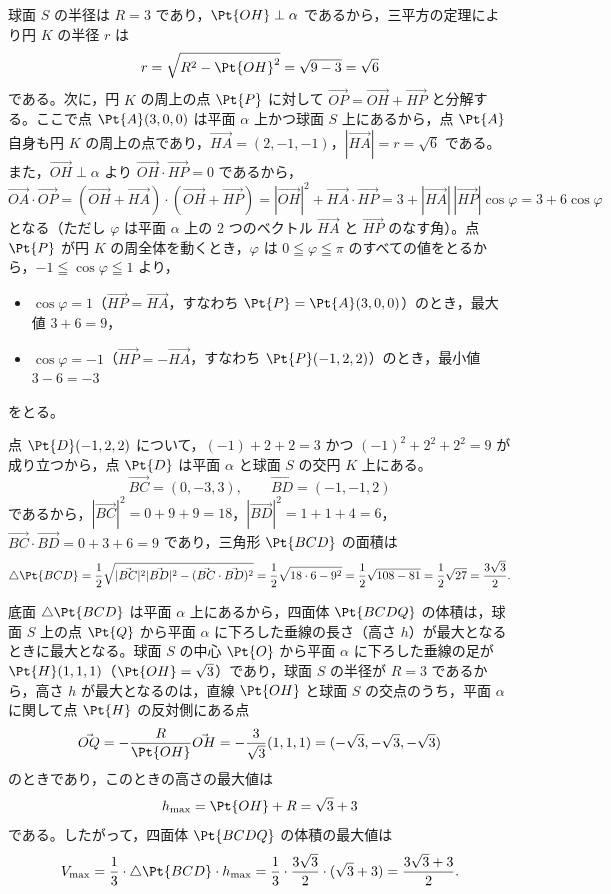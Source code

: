 
球面 $S$ の半径は $R=3$ であり，$\Pt{OH}\perp\alpha$ であるから，三平方の定理により円 $K$ の半径 $r$ は
\[
  r = \sqrt{R^{2}-\Pt{OH}^{2}} = \sqrt{9-3} = \sqrt{6}
\]
である。次に，円 $K$ の周上の点 $\Pt{P}$ に対して $\Vec{OP}=\Vec{OH}+\Vec{HP}$ と分解する。ここで点 $\Pt{A}(3, 0, 0)$ は平面 $\alpha$ 上かつ球面 $S$ 上にあるから，点 $\Pt{A}$ 自身も円 $K$ の周上の点であり，$\Vec{HA}=(2, -1, -1)$，$|\Vec{HA}|=r=\sqrt{6}$ である。また，$\Vec{OH}\perp\alpha$ より $\Vec{OH}\cdot\Vec{HP}=0$ であるから，
\[
  \Vec{OA}\cdot\Vec{OP}
  = (\Vec{OH}+\Vec{HA})\cdot(\Vec{OH}+\Vec{HP})
  = |\Vec{OH}|^{2} + \Vec{HA}\cdot\Vec{HP}
  = 3 + |\Vec{HA}|\,|\Vec{HP}|\cos\varphi
  = 3 + 6\cos\varphi
\]
となる（ただし $\varphi$ は平面 $\alpha$ 上の $2$ つのベクトル $\Vec{HA}$ と $\Vec{HP}$ のなす角）。点 $\Pt{P}$ が円 $K$ の周全体を動くとき，$\varphi$ は $0\leqq\varphi\leqq\pi$ のすべての値をとるから，$-1\leqq\cos\varphi\leqq 1$ より，
\begin{itemize}[leftmargin=1.6em,itemsep=2pt]
  \item $\cos\varphi=1$（$\Vec{HP}=\Vec{HA}$，すなわち $\Pt{P}=\Pt{A}(3,0,0)$）のとき，最大値 $3+6=9$，
  \item $\cos\varphi=-1$（$\Vec{HP}=-\Vec{HA}$，すなわち $\Pt{P}(-1,2,2)$）のとき，最小値 $3-6=-3$
\end{itemize}
をとる。


点 $\Pt{D}(-1, 2, 2)$ について，$(-1)+2+2=3$ かつ $(-1)^{2}+2^{2}+2^{2}=9$ が成り立つから，点 $\Pt{D}$ は平面 $\alpha$ と球面 $S$ の交円 $K$ 上にある。
\[
  \Vec{BC} = (0, -3, 3),\qquad \Vec{BD} = (-1, -1, 2)
\]
であるから，$|\Vec{BC}|^{2}=0+9+9=18$，$|\Vec{BD}|^{2}=1+1+4=6$，$\Vec{BC}\cdot\Vec{BD}=0+3+6=9$ であり，三角形 $\Pt{BCD}$ の面積は
\[
  \triangle\Pt{BCD}
  = \frac{1}{2}\sqrt{|\Vec{BC}|^{2}|\Vec{BD}|^{2}-(\Vec{BC}\cdot\Vec{BD})^{2}}
  = \frac{1}{2}\sqrt{18\cdot 6 - 9^{2}}
  = \frac{1}{2}\sqrt{108-81}
  = \frac{1}{2}\sqrt{27} = \frac{3\sqrt{3}}{2}.
\]


底面 $\triangle\Pt{BCD}$ は平面 $\alpha$ 上にあるから，四面体 $\Pt{BCDQ}$ の体積は，球面 $S$ 上の点 $\Pt{Q}$ から平面 $\alpha$ に下ろした垂線の長さ（高さ $h$）が最大となるときに最大となる。球面 $S$ の中心 $\Pt{O}$ から平面 $\alpha$ に下ろした垂線の足が $\Pt{H}(1, 1, 1)$（$\Pt{OH}=\sqrt{3}$）であり，球面 $S$ の半径が $R=3$ であるから，高さ $h$ が最大となるのは，直線 $\Pt{OH}$ と球面 $S$ の交点のうち，平面 $\alpha$ に関して点 $\Pt{H}$ の反対側にある点
\[
  \Vec{OQ} = -\frac{R}{\Pt{OH}}\Vec{OH} = -\frac{3}{\sqrt{3}}(1, 1, 1) = (-\sqrt{3}, -\sqrt{3}, -\sqrt{3})
\]
のときであり，このときの高さの最大値は
\[
  h_{\max} = \Pt{OH} + R = \sqrt{3} + 3
\]
である。したがって，四面体 $\Pt{BCDQ}$ の体積の最大値は
\[
  V_{\max} = \frac{1}{3}\cdot\triangle\Pt{BCD}\cdot h_{\max}
  = \frac{1}{3}\cdot\frac{3\sqrt{3}}{2}\cdot(\sqrt{3}+3)
  = \frac{3\sqrt{3}+3}{2}.
\]

